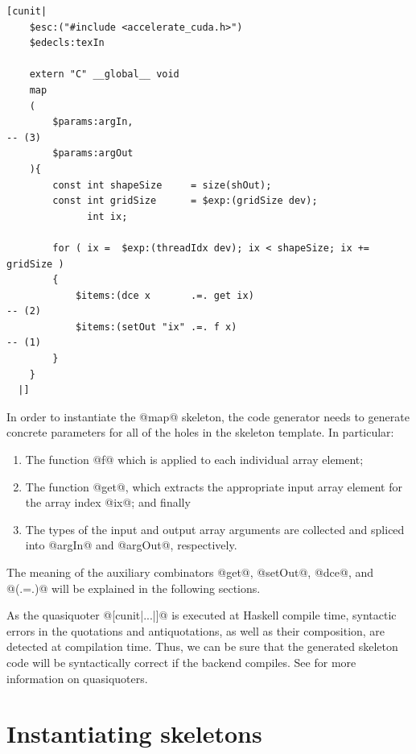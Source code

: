 \begin{lstlisting}[style=haskell_float,
    name=map_skeleton,
    label=lst:map_skeleton,
    caption={Accelerate CUDA skeleton for the \code{map} operation}]
[cunit|
    $esc:("#include <accelerate_cuda.h>")
    $edecls:texIn

    extern "C" __global__ void
    map
    (
        $params:argIn,                                                                 -- (3)
        $params:argOut
    ){
        const int shapeSize     = size(shOut);
        const int gridSize      = $exp:(gridSize dev);
              int ix;

        for ( ix =  $exp:(threadIdx dev); ix < shapeSize; ix += gridSize )
        {
            $items:(dce x       .=. get ix)                                            -- (2)
            $items:(setOut "ix" .=. f x)                                               -- (1)
        }
    }
  |]
\end{lstlisting}

In order to instantiate the @map@ skeleton, the code generator needs to
generate concrete parameters for all of the holes in the skeleton template. In
particular:
%
\begin{enumerate}
\item The function @f@ which is applied to each individual array element;

\item The function @get@, which extracts the appropriate input array
    element for the array index @ix@; and finally

\item The types of the input and output array arguments are collected and
    spliced into @argIn@ and @argOut@, respectively.

\end{enumerate}
%
The meaning of the auxiliary combinators @get@, @setOut@, @dce@, and @(.=.)@
will be explained in the following sections.

As the quasiquoter @[cunit|...|]@ is executed at Haskell compile time,
syntactic errors in the quotations and antiquotations, as well as their
composition, are detected at compilation time. Thus, we can be sure that the
generated skeleton code will be syntactically correct if the backend compiles.
See \cite{Mainland:2007bl} for more information on quasiquoters.


\section{Instantiating skeletons}
\label{sec:instantiating_skeletons}

